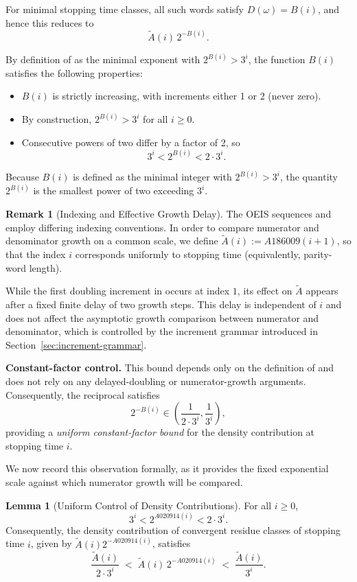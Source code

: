 \documentclass[12pt, oneside]{article}   	%
\numberwithin{equation}{section}          %
\theoremstyle{definition}
\newtheorem{lemma}[theorem]{Lemma}
\newtheorem*{remark}{Remark}
\begin{document}
For minimal stopping time classes, all such words satisfy
$D(\omega)=B(i)$, and hence this reduces to
\[
\widetilde A(i)\, 2^{-B(i)}.
\]

By definition of  as the minimal exponent with $2^{B(i)} > 3^i$, the function
$B(i)$ satisfies the following properties:
\begin{itemize}
    \item $B(i)$ is strictly increasing, with increments either 1 or 2 (never zero).
    \item By construction, $2^{B(i)} > 3^i$ for all $i \ge 0$.
    \item Consecutive powers of two differ by a factor of 2, so
    \[
    3^i < 2^{B(i)} < 2 \cdot 3^i.
    \]
\end{itemize}

Because $B(i)$ is defined as the minimal integer with $2^{B(i)} > 3^i$,
the quantity $2^{B(i)}$ is the smallest power of two exceeding $3^i$.

\begin{remark}[Indexing and Effective Growth Delay]
The OEIS sequences  and  employ differing indexing
conventions. In order to compare numerator and denominator growth on a common
scale, we define \(\widetilde A(i) := A186009(i+1)\), so that the index \(i\)
corresponds uniformly to stopping time (equivalently, parity-word length).

While the first doubling increment in  occurs at index $1$, its
effect on $\widetilde A$ appears after a fixed finite delay of two growth
steps. This delay is independent of $i$ and does not affect the asymptotic
growth comparison between numerator and denominator, which is controlled by
the increment grammar introduced in Section~\ref{sec:increment-grammar}.
\end{remark}

\noindent
\textbf{Constant-factor control.}
This bound depends only on the definition of  and does not rely on
any delayed-doubling or numerator-growth arguments. Consequently, the reciprocal satisfies
\[
2^{-B(i)} \in \left( \frac{1}{2 \cdot 3^i}, \frac{1}{3^i} \right),
\]
providing a \emph{uniform constant-factor bound} for the density contribution at stopping time $i$.

We now record this observation formally, as it provides the fixed exponential scale against
which numerator growth will be compared.

\begin{lemma}[Uniform Control of Density Contributions]
\label{lem:uniform-control}
For all $i \ge 0$,
\[
3^i < 2^{A020914(i)} < 2\cdot 3^i.
\]
Consequently, the density contribution of convergent residue classes of
stopping time $i$, given by \(\widetilde A(i) 2^{-A020914(i)}\), satisfies
\[
\frac{\widetilde A(i)}{2 \cdot 3^i}
\;<\;
\widetilde A(i)\,2^{-A020914(i)}
\;<\;
\frac{\widetilde A(i)}{3^i}.
\]
\end{lemma}
\end{document}
